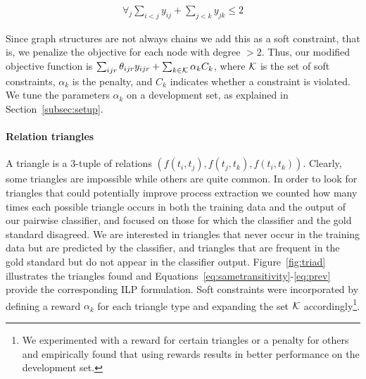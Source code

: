 \begin{align}
\forall_j \sum_{i<j} y_{ij} + \sum_{j<k} y_{jk} \leq 2
\end{align}

Since graph structures are not always chains we add this as a soft constraint, that is, we penalize the objective for each node with degree $>2$. Thus, our modified objective function is $\sum_{ijr} \theta_{ijr} y_{ijr} + \sum_{k \in \mathcal{K}} \alpha_k C_k$, where $\mathcal{K}$ is the set of soft constraints, $\alpha_k$ is the penalty, and $C_k$ indicates whether a constraint is violated. We tune the parameters $\alpha_k$ on a development set, as explained in Section~\ref{subsec:setup}.

\paragraph{Relation triangles} 
A triangle is a 3-tuple of relations $(f(t_i,t_j),f(t_j,t_k),f(t_i,t_k))$. Clearly, some triangles are impossible while others are quite common. In order to look for triangles that could potentially improve process extraction we counted how many times each possible triangle occurs in both the training data and the output of our pairwise classifier, and focused on those for which the classifier and the gold standard disagreed. We are interested in triangles that never occur in the training data but are predicted by the classifier, and triangles that are frequent in the gold standard but do not appear in the classifier output. Figure~\ref{fig:triad} illustrates the triangles found and Equations~\ref{eq:sametransitivity}-\ref{eq:prev} provide the corresponding ILP formulation. Soft constraints were incorporated by defining a reward $\alpha_k$ for each triangle type and expanding the set $\mathcal{K}$ accordingly\footnote{We experimented with a reward for certain triangles or a penalty for others and empirically found that using rewards results in better performance on the development set.}. 

